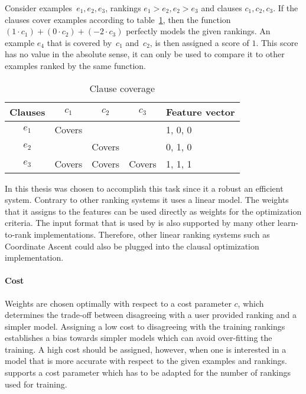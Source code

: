 \begin{example}
	Consider examples~$e_1, e_2, e_3$, rankings $e_1 > e_2, e_2 > e_3$ and clauses $c_1, c_2, c_3$.
	If the clauses cover examples according to table~\ref{tbl:cover_examples}, then the function $(1 \cdot c_1) + (0\cdot c_2) + (-2\cdot c_3)$ perfectly models the given rankings.
	An example $e_4$ that is covered by~$c_1$ and~$c_2$, is then assigned a score of $1$.
	This score has no value in the absolute sense, it can only be used to compare it to other examples ranked by the same function.

	\begin{table}[!htp]
	\label{tbl:cover_examples}
	\begin{tabularx}{\textwidth}{c|ccc|X}
		\textbf{Clauses}	&$c_1$  	& $c_2$ 	& $c_3$ 	& \textbf{Feature vector}\\
		\toprule
		$e_1$ 				& Covers 	&  			&  			& 1, 0, 0\\
		$e_2$ 				& 			& Covers	&  			& 0, 1, 0\\
		$e_3$ 				& Covers 	& Covers 	& Covers 	& 1, 1, 1\\
	\end{tabularx}
	\caption{Clause coverage}
	\end{table}

\end{example}

In this thesis \svm{} was chosen to accomplish this task since it a robust an efficient system.
Contrary to other ranking systems it uses a linear model.
The weights that it assigns to the features can be used directly as weights for the optimization criteria.
The input format that is used by \svm is also supported by many other learn-to-rank implementations.
Therefore, other linear ranking systems such as Coordinate Ascent \cite{metzler2007linear} could also be plugged into the clausal optimization implementation.

\paragraph{Cost}
Weights are chosen optimally with respect to a cost parameter $c$, which determines the trade-off between disagreeing with a user provided ranking and a simpler model.
Assigning a low cost to disagreeing with the training rankings establishes a bias towards simpler models which can avoid over-fitting the training.
A high cost should be assigned, however, when one is interested in a model that is more accurate with respect to the given examples and rankings.
\svm supports a cost parameter which has to be adapted for the number of rankings used for training.


